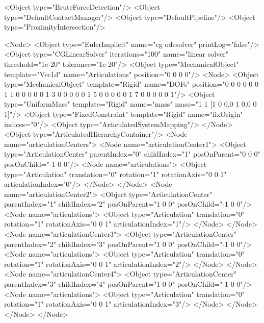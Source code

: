 \begin{code_xml}
<Object type="BruteForceDetection"/>
<Object type="DefaultContactManager"/>
<Object type="DefaultPipeline"/>
<Object type="ProximityIntersection"/>

<Node>
  <Object type="EulerImplicit" name="cg odesolver" printLog="false"/>
  <Object type="CGLinearSolver" iterations="100" name="linear solver" threshold="1e-20" tolerance="1e-20"/>
  <Object type="MechanicalObject" template="Vec1d" name="Articulations"
          position="0 0 0 0"/>
  <Node>
    <Object type="MechanicalObject" template="Rigid" name="DOFs"
            position="0 0 0  0 0 0 1 
                      1 0 0  0 0 0 1 
                      3 0 0  0 0 0 1 
                      5 0 0  0 0 0 1 
                      7 0 0  0 0 0 1"/>
    <Object type="UniformMass" template="Rigid" name="mass"
            mass="1 1 [1 0 0,0 1 0,0 0 1]"/>
    <Object type="FixedConstraint" template="Rigid" name="fixOrigin"
            indices="0"/>
    <Object type="ArticulatedSystemMapping"/>
  </Node>
  <Object type="ArticulatedHierarchyContainer"/>
  <Node name="articulationCenters">
    <Node name="articulationCenter1">
      <Object type="ArticulationCenter" 
              parentIndex="0" 
              childIndex="1" 
              posOnParent="0 0 0" 
              posOnChild="-1 0 0"/>
      <Node name="articulations">
        <Object type="Articulation" 
                translation="0" 
                rotation="1" 
                rotationAxis="0 0 1" 
                articulationIndex="0"/>
      </Node>
    </Node>
    <Node name="articulationCenter2">
      <Object type="ArticulationCenter" 
              parentIndex="1" 
              childIndex="2" 
              posOnParent="1 0 0" 
              posOnChild="-1 0 0"/>
      <Node name="articulations">
        <Object type="Articulation" 
                translation="0" 
                rotation="1" 
                rotationAxis="0 0 1" 
                articulationIndex="1"/>
      </Node>
    </Node>
    <Node name="articulationCenter3">
      <Object type="ArticulationCenter" 
              parentIndex="2" 
              childIndex="3" 
              posOnParent="1 0 0" 
              posOnChild="-1 0 0"/>
      <Node name="articulations">
        <Object type="Articulation" 
                translation="0" 
                rotation="1" 
                rotationAxis="0 0 1" 
                articulationIndex="2"/>
      </Node>
    </Node>
    <Node name="articulationCenter4">
      <Object type="ArticulationCenter" 
              parentIndex="3" 
              childIndex="4" 
              posOnParent="1 0 0" 
              posOnChild="-1 0 0"/>
      <Node name="articulations">
        <Object type="Articulation" 
                translation="0" 
                rotation="1" 
                rotationAxis="0 0 1" 
                articulationIndex="3"/>
      </Node>
    </Node>
  </Node>
</Node>	

\end{code_xml}

